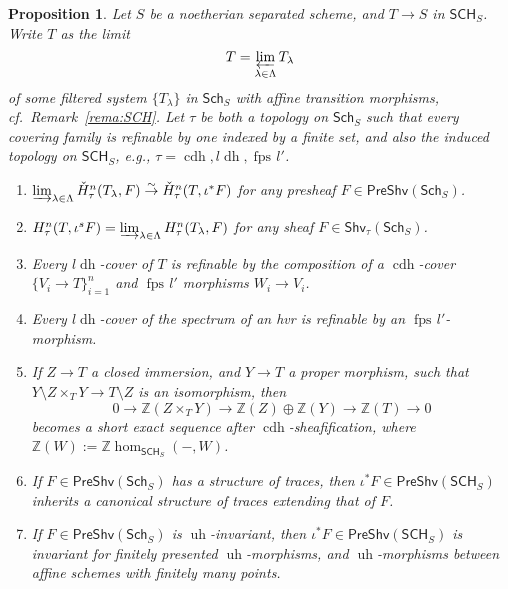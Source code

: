 \documentclass[10pt]{amsart}
\newtheorem{prop}[theo]{Proposition}
\theoremstyle{definition}
\newcommand{\ZZ}{\mathbb{Z}}
\DeclareMathOperator{\Spec}{Spec}
\newcommand{\PreShv}{\mathsf{PreShv}}
\newcommand{\Shv}{\mathsf{Shv}}
\newcommand{\Sch}{\mathsf{Sch}}
\newcommand{\SCH}{\mathsf{SCH}}
\newcommand{\fpsl}{{\operatorname{fps\!}l'}}
\newcommand{\cdh}{{{\operatorname{cdh}}}}
\newcommand{\ldh}{{l{\operatorname{dh}}}}
\newcommand{\uh}{\operatorname{uh}}
\newcommand{\cduh}{\operatorname{cduh}}
\begin{document}

\begin{prop} \label{prop:SCH}
Let $S$ be a noetherian separated scheme, and $T {\to} S$ in $\SCH_S$. Write $T$ as the limit 
\[ T = \varprojlim_{\lambda \in \Lambda} T_\lambda \]
of some filtered system $\{T_\lambda\}$ in $\Sch_S$ with affine transition morphisms, cf.~Remark~\ref{rema:SCH}. Let $\tau$ be both a topology on $\Sch_S$ such that every covering family is refinable by one indexed by a finite set, and also the induced topology on $\SCH_S$, e.g., $\tau = \cdh, \ldh, \fpsl$.
\begin{enumerate}
 \item \label{prop:SCH:cech} $\varinjlim_{\lambda \in \Lambda}\check{H}^n_\tau(T_\lambda, F) \stackrel{\sim}{\to} \check{H}^n_\tau(T, \iota^*F)$ for any presheaf $F \in \PreShv(\Sch_S)$.
 
 \item \label{prop:SCH:coh} $H^n_\tau(T, \iota^sF) = \varinjlim_{\lambda \in \Lambda} H^n_\tau(T_\lambda, F)$ for any sheaf $F \in \Shv_\tau(\Sch_S)$. 
 
 \item \label{prop:SCH:ldhRefine} Every $\ldh$-cover of $T$ is refinable by the composition of a $\cdh$-cover \mbox{$\{V_i \to T\}_{i = 1}^n$} and $\fpsl$ morphisms $W_i \to V_i$. 

 \item \label{prop:SCH:hvrrefine} Every $\ldh$-cover of the spectrum of an hvr %
 is refinable by an $\fpsl$-morphism. %

 \item \label{prop:SCH:bu} If $Z \to T$ a closed immersion, and $Y \to T$ a proper morphism, such that $Y \setminus Z \times_T Y \to T \setminus Z$ is an isomorphism, then 
 \[ 0 \to \ZZ(Z \times_T Y) \to \ZZ(Z) \oplus \ZZ(Y) \to \ZZ(T) \to 0 \]
becomes a short exact sequence after $\cdh$-sheafification, where $\ZZ(W) := \ZZ \hom_{\SCH_S}(-, W)$.

 \item If $F \in \PreShv(\Sch_S)$ has a structure of traces, then $\iota^*F \in \PreShv(\SCH_S)$ inherits a canonical structure of traces extending that of $F$.
 
 \item \label{prop:SCH:uhInv} If $F \in \PreShv(\Sch_S)$ is $\uh$-invariant, then $\iota^*F  \in \PreShv(\SCH_S)$ is invariant for finitely presented $\uh$-morphisms, and $\uh$-morphisms between affine schemes with finitely many points.%
\end{enumerate}
\end{prop}
\end{document}
